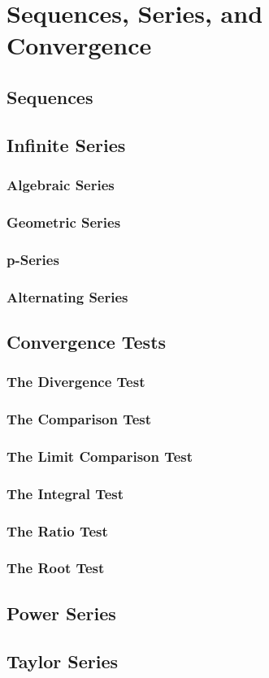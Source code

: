 \chapter{Sequences, Series, and Convergence}

\section{Sequences}

\section{Infinite Series}
\subsection{Algebraic Series}
\subsection{Geometric Series}
\subsection{p-Series}
\subsection{Alternating Series}

\section{Convergence Tests}
\subsection{The Divergence Test}

\subsection{The Comparison Test}
\subsection{The Limit Comparison Test}
\subsection{The Integral Test}
\subsection{The Ratio Test}
\subsection{The Root Test}

\section{Power Series}

\section{Taylor Series}
